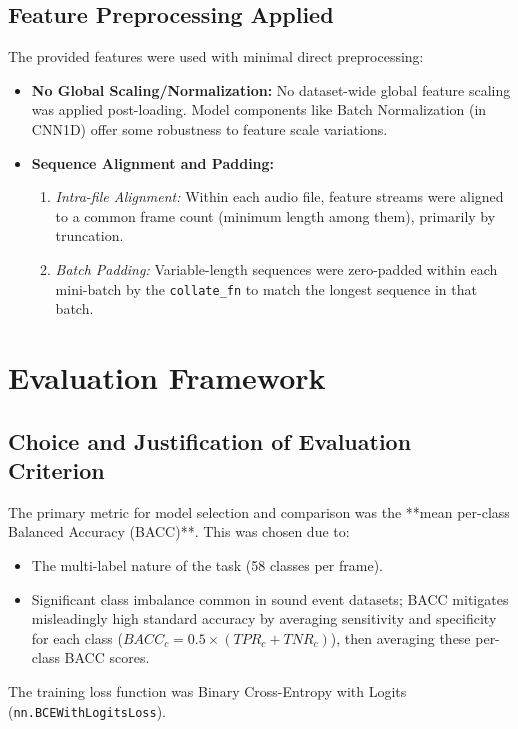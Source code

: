 \documentclass[11pt, a4paper]{article}
\newcommand{\code}[1]{\texttt{#1}}
\begin{document}
\subsection{Feature Preprocessing Applied}
The provided features were used with minimal direct preprocessing:
\begin{itemize}
    \item \textbf{No Global Scaling/Normalization:} No dataset-wide global feature scaling was applied post-loading. Model components like Batch Normalization (in CNN1D) offer some robustness to feature scale variations.
    \item \textbf{Sequence Alignment and Padding:}
    \begin{enumerate}[label=(\roman*)]
        \item \textit{Intra-file Alignment:} Within each audio file, feature streams were aligned to a common frame count (minimum length among them), primarily by truncation.
        \item \textit{Batch Padding:} Variable-length sequences were zero-padded within each mini-batch by the \code{collate\_fn} to match the longest sequence in that batch.
    \end{enumerate}
\end{itemize}

\section{Evaluation Framework}
\label{sec:evaluation_framework}

\subsection{Choice and Justification of Evaluation Criterion}
The primary metric for model selection and comparison was the **mean per-class Balanced Accuracy (BACC)**. This was chosen due to:
\begin{itemize}
    \item The multi-label nature of the task (58 classes per frame).
    \item Significant class imbalance common in sound event datasets; BACC mitigates misleadingly high standard accuracy by averaging sensitivity and specificity for each class ($BACC_c = 0.5 \times (TPR_c + TNR_c)$), then averaging these per-class BACC scores.
\end{itemize}
The training loss function was Binary Cross-Entropy with Logits (\code{nn.BCEWithLogitsLoss}).
\end{document}
